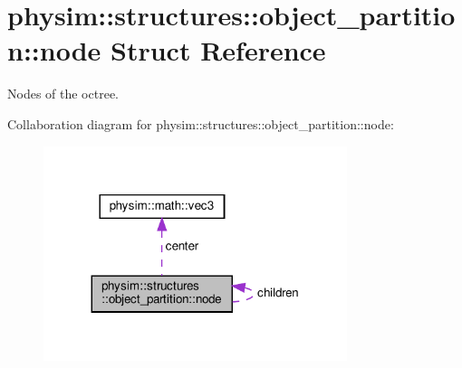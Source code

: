 \hypertarget{structphysim_1_1structures_1_1object__partition_1_1node}{}\section{physim\+:\+:structures\+:\+:object\+\_\+partition\+:\+:node Struct Reference}
\label{structphysim_1_1structures_1_1object__partition_1_1node}


Nodes of the octree.  




Collaboration diagram for physim\+:\+:structures\+:\+:object\+\_\+partition\+:\+:node\+:\nopagebreak
\begin{figure}[H]
\begin{center}
\leavevmode
\includegraphics[width=251pt]{structphysim_1_1structures_1_1object__partition_1_1node__coll__graph}
\end{center}
\end{figure}
